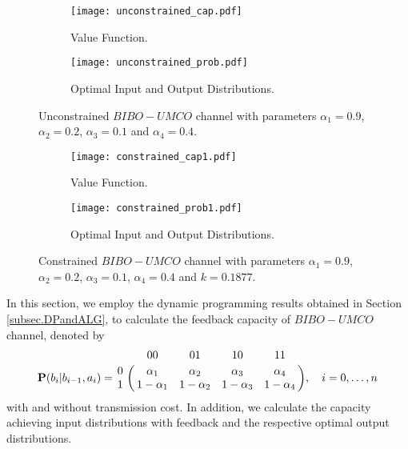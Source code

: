 \documentclass[11pt, a4paper, journal,onecolumn]{IEEEtran}
\begin{document}
\begin{figure}
    \centering
    \begin{subfigure}[b]{0.49\textwidth}
        \centering
        \texttt{[image: unconstrained\_cap.pdf]}
        \caption{Value Function.}\label{fig.DP.bsnsc.a}
    \end{subfigure}
    \hfill
    \begin{subfigure}[b]{0.49\textwidth}
        \centering
        \texttt{[image: unconstrained\_prob.pdf]}      
        \caption{Optimal Input and Output Distributions.}\label{fig.DP.bsnsc.b}
    \end{subfigure}
    \caption{Unconstrained $BIBO-UMCO$ channel with parameters $\alpha_1=0.9$, $\alpha_2=0.2$, $\alpha_3=0.1$ and $\alpha_4=0.4$.}\label{fig.DP.bsnsc}
\end{figure}
\begin{figure}[!h]
    \centering
    \begin{subfigure}[b]{0.49\textwidth}
        \centering
        \texttt{[image: constrained\_cap1.pdf]}
        \caption{Value Function.}\label{fig.DP.bsnsc.a1}
    \end{subfigure}
    \hfill
    \begin{subfigure}[b]{0.49\textwidth}
        \centering
        \texttt{[image: constrained\_prob1.pdf]}      
        \caption{Optimal Input and Output Distributions.}\label{fig.DP.bsnsc.b1}
    \end{subfigure}
    \caption{Constrained  $BIBO-UMCO$ channel with parameters $\alpha_1=0.9$, $\alpha_2=0.2$, $\alpha_3=0.1$, $\alpha_4=0.4$ and $k=0.1877$.}\label{fig.DP.bsnsccon1}
\end{figure}




In this section, we employ the dynamic programming results obtained in Section \ref{subsec.DPandALG}, to calculate the feedback capacity of $BIBO-UMCO$ channel, denoted by 
\begin{equation}\label{trans.prob.matr.bsnsc}
 {\bf P}(b_i|b_{i-1},a_i)=\bordermatrix{&00&01&10&11\cr
            0&\alpha_1&\alpha_2&\alpha_3&\alpha_4\cr
            1&1-\alpha_1&1-\alpha_2&1-\alpha_3&1-\alpha_4\cr},\quad i=0,\dots,n
\end{equation}
with and without transmission cost. In addition, we calculate  the  capacity achieving input distributions with feedback and the respective optimal output distributions.\\
\end{document}
